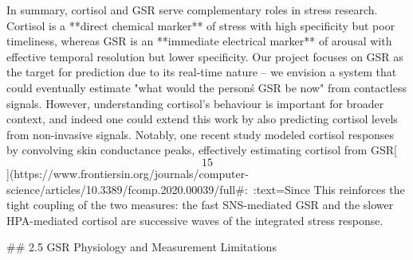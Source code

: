 \documentclass[12pt,a4paper]{article}
\begin{document}
In summary, cortisol and GSR serve complementary roles in stress
research. Cortisol is a **direct chemical marker** of stress with high
specificity but poor timeliness, whereas GSR is an **immediate
electrical marker** of arousal with effective temporal resolution but
lower specificity. Our project focuses on GSR as the target for
prediction due to its real-time nature -- we envision a system that
could eventually estimate "what would the person\'s GSR be now" from
contactless signals. However, understanding cortisol's behaviour is
important for broader context, and indeed one could extend this work by
also predicting cortisol levels from non-invasive signals. Notably, one
recent study modeled cortisol responses by convolving skin conductance
peaks, effectively estimating cortisol from
GSR[\[15\]](https://www.frontiersin.org/journals/computer-science/articles/10.3389/fcomp.2020.00039/full#:~:text=Since%
This reinforces the tight coupling of the two measures: the fast
SNS-mediated GSR and the slower HPA-mediated cortisol are successive
waves of the integrated stress response.

## 2.5 GSR Physiology and Measurement Limitations
\end{document}
